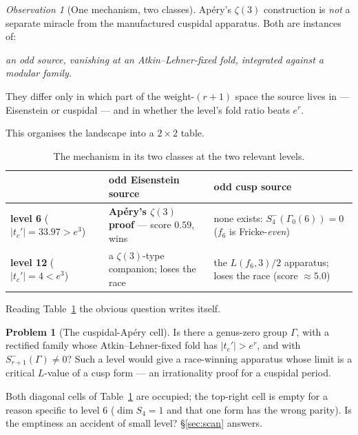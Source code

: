 \documentclass[11pt,reqno]{amsart}
\theoremstyle{plain}
\theoremstyle{definition}
\newtheorem{problem}[theorem]{Problem}
\theoremstyle{remark}
\newtheorem{observation}[theorem]{Observation}
\newcommand{\tcp}{t_c'}
\newcommand{\Ga}{\Gamma_0}
\begin{document}
\begin{observation}[One mechanism, two classes]
\label{obs:unify}
Ap\'ery's $\zeta(3)$ construction is \emph{not} a separate miracle from
the manufactured cuspidal apparatus. Both are instances of:
\begin{center}
\emph{an odd source, vanishing at an Atkin--Lehner-fixed fold, integrated
against a modular family.}
\end{center}
They differ only in which part of the weight-$(r+1)$ space the source
lives in --- Eisenstein or cuspidal --- and in whether the level's fold
ratio beats $e^r$.
\end{observation}

This organises the landscape into a $2\times2$ table.

\begin{table}[h]
\centering
\renewcommand{\arraystretch}{1.35}
\begin{tabular}{@{}l>{\raggedright\arraybackslash}p{4.6cm}>{\raggedright\arraybackslash}p{5.0cm}@{}}
\toprule
 & \textbf{odd Eisenstein source} & \textbf{odd cusp source} \\
\midrule
\textbf{level 6} \newline ($|\tcp|=33.97>e^3$) &
  \textbf{Ap\'ery's $\zeta(3)$ proof} --- score $0.59$, wins &
  none exists: $S_4^-(\Ga(6))=0$ \newline ($f_6$ is Fricke-\emph{even}) \\
\textbf{level 12} \newline ($|\tcp|=4<e^3$) &
  a $\zeta(3)$-type companion; loses the race &
  the $L(f_6,3)/2$ apparatus; loses the race (score $\approx5.0$) \\
\bottomrule
\end{tabular}
\medskip
\caption{The mechanism in its two classes at the two relevant levels.}
\label{tab:2x2}
\end{table}

Reading Table~\ref{tab:2x2} the obvious question writes itself.

\begin{problem}[The cuspidal-Ap\'ery cell]
\label{prob:cell}
Is there a genus-zero group $\Gamma$, with a rectified family whose
Atkin--Lehner-fixed fold has $|\tcp|>e^r$, and with
$S^-_{r+1}(\Gamma)\ne 0$? Such a level would give a race-winning
apparatus whose limit is a critical $L$-value of a cusp form --- an
irrationality proof for a cuspidal period.
\end{problem}

Both diagonal cells of Table~\ref{tab:2x2} are occupied; the top-right
cell is empty for a reason specific to level $6$ ($\dim S_4=1$ and that
one form has the wrong parity). Is the emptiness an accident of small
level? \S\ref{sec:scan} answers.
\end{document}
